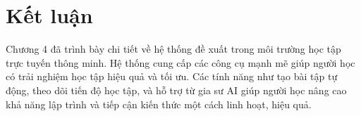 



\section{Kết luận}
Chương 4 đã trình bày chi tiết về hệ thống đề xuất trong môi trường học tập trực tuyến thông minh. Hệ thống cung cấp các công cụ mạnh mẽ giúp người học có trải nghiệm học tập hiệu quả và tối ưu. Các tính năng như tạo bài tập tự động, theo dõi tiến độ học tập, và hỗ trợ từ gia sư AI giúp người học nâng cao khả năng lập trình và tiếp cận kiến thức một cách linh hoạt, hiệu quả.